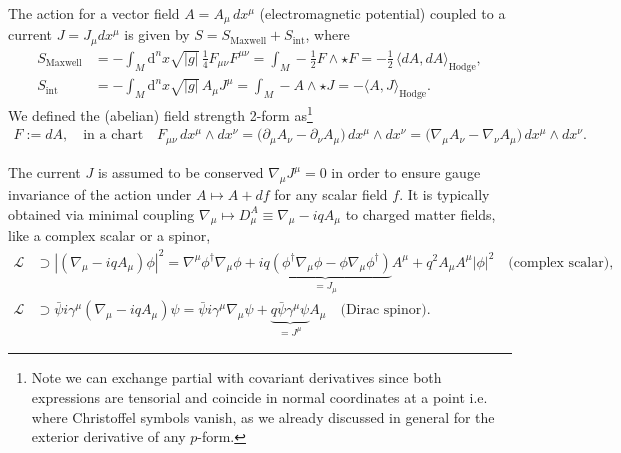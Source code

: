 \begin{mytheorem}
%
The action for a vector field $A=A_\mu \,dx^\mu$ (electromagnetic potential) coupled to a current $J=J_\mu d x^\mu$ is given by $S=S_{\mathrm{Maxwell}}+S_{\mathrm{int}}$, where
\begin{align}
    S_{\mathrm{Maxwell}}&= -\int_M \!\!\mathrm{d}^n x \sqrt{|g|}\, \tfrac{1}{4} F_{\mu\nu} F^{\mu\nu} 
    = \int_M\!\! -\tfrac{1}{2} F \wedge \star F  = -\tfrac{1}{2}\,\langle dA, dA\rangle_{\mathrm{Hodge}},
    \\
    S_{\mathrm{int}}&= -\int_M \!\!\mathrm{d}^n x \sqrt{|g|}\, A_\mu J^\mu = \int_M -A \wedge \star J = -\langle A, J \rangle_{\mathrm{Hodge}}.
\end{align}
We defined the (abelian) field strength 2-form as\footnote{\label{fn:covariant_vs_partial_dif_forms}Note we can exchange partial with covariant derivatives since both expressions are tensorial and coincide in normal coordinates at a point i.e. where Christoffel symbols vanish, as we already discussed in general for the exterior derivative of any $p$-form.}
\begin{align}
    F:=dA, \quad \text{in a chart}\quad F_{\mu\nu} \,dx^\mu\wedge dx^\nu = \Big(\partial_\mu A_\nu - \partial_\nu A_\mu\Big)\, dx^\mu\wedge dx^\nu =\Big(\nabla_\mu A_\nu - \nabla_\nu A_\mu\Big)\, dx^\mu\wedge dx^\nu.
\end{align}
%

The current $J$ is assumed to be conserved $\nabla_\mu J^\mu=0$ in order to ensure gauge invariance of the action under $A\mapsto A + d f$ for any scalar field $f$.
%
It is typically obtained via minimal coupling $\nabla_\mu \mapsto D_\mu^A\equiv\nabla_\mu - i q A_\mu$ to charged matter fields, like a complex scalar or a spinor,
\begin{align}
    \mathcal{L}&\supset |(\nabla_\mu - i q A_\mu)\phi|^2 = \nabla^\mu\phi^\dagger \nabla_\mu \phi + \underbrace{i q (\phi^\dagger \nabla_\mu \phi - \phi \nabla_\mu \phi^\dagger)}_{=J_\mu}A^\mu + q^2 A_\mu A^\mu |\phi|^2 \quad \text{(complex scalar),}
    \\[7pt]
    \mathcal{L}&\supset \bar{\psi} i \gamma^\mu (\nabla_\mu - i q A_\mu)\psi = \bar{\psi} i \gamma^\mu \nabla_\mu \psi +  \underbrace{q\bar{\psi} \gamma^\mu \psi}_{=J^\mu} A_\mu \quad \text{(Dirac spinor).}
\end{align}


\end{mytheorem}
